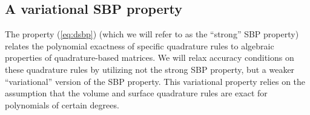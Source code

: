 \documentclass[review]{siamart0216}
\theoremstyle{assumption}
\begin{document}
%


\subsection{A variational SBP property}


The property (\ref{eq:dsbp}) (which we will refer to as the ``strong'' SBP property) relates the polynomial exactness of specific quadrature rules to algebraic properties of quadrature-based matrices.  We will relax accuracy conditions on these quadrature rules by utilizing not the strong SBP property, but a weaker ``variational'' version of the SBP property.  This variational property relies on the assumption that the volume and surface quadrature rules are exact for polynomials of certain degrees.  
\end{document}
